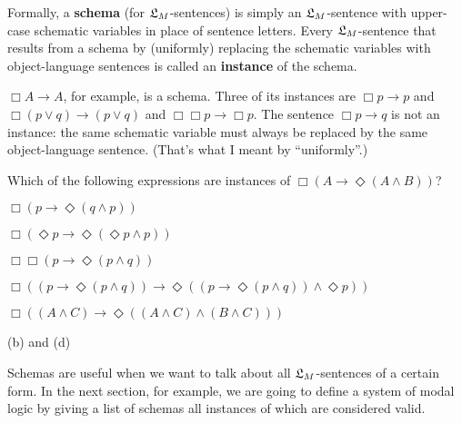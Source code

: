 
Formally, a \textbf{schema} (for $\mathfrak{L}_{M}$-sentences) is simply an
$\mathfrak{L}_{M}$-sentence with upper-case schematic variables in place of sentence
letters. Every $\mathfrak{L}_{M}$-sentence that results from a schema by (uniformly)
replacing the schematic variables with object-language sentences is called an
\textbf{instance} of the schema.


$\Box A \to A$, for example, is a schema. Three of its instances are
$\Box p \to p$ and $\Box (p \lor q) \to (p \lor q)$ and
$\Box \Box p \to \Box p$. The sentence $\Box p \to q$ is not an instance: the
same schematic variable must always be replaced by the same object-language
sentence. (That's what I meant by ``uniformly''.)

\begin{exercise}
  Which of the following expressions are instances of
  $\Box(A\to \Diamond (A \land B))$?
  \begin{exlist}
  \item $\Box(p \to \Diamond (q\land p))$
  \item $\Box(\Diamond p \to \Diamond (\Diamond p\land p))$
  \item $\Box\Box(p \to \Diamond (p \land q))$
  \item $\Box((p \to \Diamond (p \land q)) \to \Diamond((p \to \Diamond (p \land q)) \land \Diamond p))$
  \item $\Box((A\land C) \to \Diamond ((A\land C) \land (B\land C)))$
  \end{exlist}
\end{exercise}
\begin{solution}
  (b) and (d)
\end{solution}


Schemas are useful when we want to talk about all $\mathfrak{L}_{M}$-sentences of a
certain form. In the next section, for example, we are going to define a system
of modal logic by giving a list of schemas all instances of which are considered
valid.

